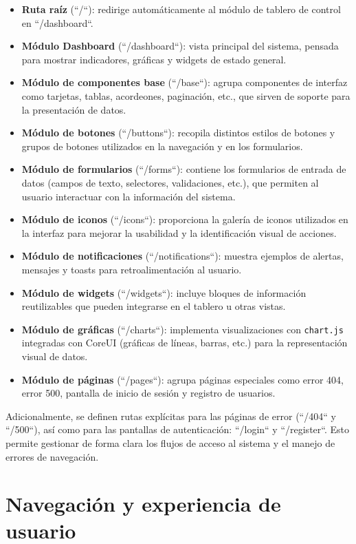 \begin{itemize}
  \item \textbf{Ruta raíz} (``/``): redirige automáticamente al módulo de tablero de control en ``/dashboard``.
  \item \textbf{Módulo Dashboard} (``/dashboard``): vista principal del sistema, pensada para mostrar indicadores, gráficas y widgets de estado general.
  \item \textbf{Módulo de componentes base} (``/base``): agrupa componentes de interfaz como tarjetas, tablas, acordeones, paginación, etc., que sirven de soporte para la presentación de datos.
  \item \textbf{Módulo de botones} (``/buttons``): recopila distintos estilos de botones y grupos de botones utilizados en la navegación y en los formularios.
  \item \textbf{Módulo de formularios} (``/forms``): contiene los formularios de entrada de datos (campos de texto, selectores, validaciones, etc.), que permiten al usuario interactuar con la información del sistema.
  \item \textbf{Módulo de iconos} (``/icons``): proporciona la galería de iconos utilizados en la interfaz para mejorar la usabilidad y la identificación visual de acciones.
  \item \textbf{Módulo de notificaciones} (``/notifications``): muestra ejemplos de alertas, mensajes y toasts para retroalimentación al usuario.
  \item \textbf{Módulo de widgets} (``/widgets``): incluye bloques de información reutilizables que pueden integrarse en el tablero u otras vistas.
  \item \textbf{Módulo de gráficas} (``/charts``): implementa visualizaciones con \texttt{chart.js} integradas con CoreUI (gráficas de líneas, barras, etc.) para la representación visual de datos.
  \item \textbf{Módulo de páginas} (``/pages``): agrupa páginas especiales como error 404, error 500, pantalla de inicio de sesión y registro de usuarios.
\end{itemize}

Adicionalmente, se definen rutas explícitas para las páginas de error (``/404`` y ``/500``), así como para las pantallas de autenticación: ``/login`` y ``/register``. Esto permite gestionar de forma clara los flujos de acceso al sistema y el manejo de errores de navegación.

\section{Navegación y experiencia de usuario}

